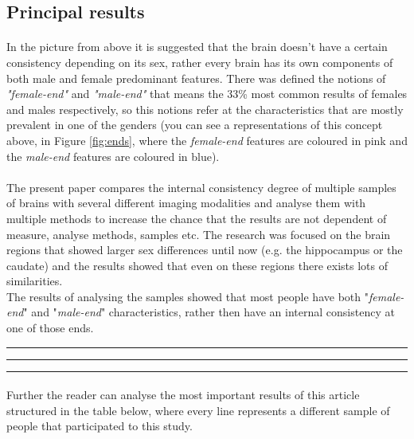 \documentclass[paper=a4, fontsize=11pt]{scrartcl} %
\numberwithin{equation}{section} %
\numberwithin{figure}{section} %
\numberwithin{table}{section} %
\newcommand{\itl}{\textit}
\begin{document}
\subsection{Principal results}
	\paragraph{}
			In the picture from above it is suggested that the brain doesn't have a certain consistency depending on its sex, rather every brain has its own components of both male and female predominant features.
			There was defined the notions of \itl{"female-end"} and \itl{"male-end"} that means the 33\% most common results of females and males respectively, so this notions refer at the characteristics that are mostly prevalent in one of the genders (you can see a representations of this concept above, in Figure \ref{fig:ends}, where the \itl{female-end} features are coloured in pink and the \itl{male-end} features are coloured in blue).\paragraph{}
	The present paper compares the internal consistency degree of multiple samples of brains with several different imaging modalities and analyse them with multiple methods to increase the chance that the results are not dependent of measure, analyse methods, samples etc.
	The research was focused on the brain regions that showed larger sex differences until now (e.g. the hippocampus or the caudate) and the results showed that even on these regions there exists lots of similarities.\\
	The results of analysing the samples showed that most people have both "\itl{female-end}" and "\itl{male-end}" characteristics, rather then have an internal consistency at one of those ends.
	\hrule\hrule\hrule\paragraph{}
Further the reader can analyse the most important results of this article structured in the table below, where every line represents a different sample of people that participated to this study.
\end{document}
